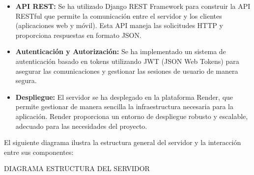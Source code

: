 \begin{itemize}
    \item \textbf{API REST:} Se ha utilizado Django REST Framework para construir la API RESTful que permite la comunicación entre el servidor y los clientes (aplicaciones web y móvil). Esta API maneja las solicitudes HTTP y proporciona respuestas en formato JSON.
    
    \item \textbf{Autenticación y Autorización:} Se ha implementado un sistema de autenticación basado en tokens utilizando JWT (JSON Web Tokens) para asegurar las comunicaciones y gestionar las sesiones de usuario de manera segura.
    
    \item \textbf{Despliegue:} El servidor se ha desplegado en la plataforma Render, que permite gestionar de manera sencilla la infraestructura necesaria para la aplicación. Render proporciona un entorno de despliegue robusto y escalable, adecuado para las necesidades del proyecto.
\end{itemize}

El siguiente diagrama ilustra la estructura general del servidor y la interacción entre sus componentes:

DIAGRAMA ESTRUCTURA DEL SERVIDOR